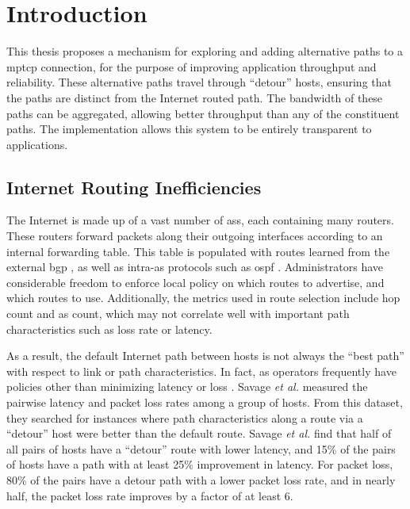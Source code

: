 \documentclass{cwru}
\begin{document}
\acresetall

\mainmatter
\chapter{Introduction}

This thesis proposes a mechanism for exploring and adding alternative paths to a
\ac{mptcp} connection, for the purpose of improving application throughput and
reliability. These alternative paths travel through ``detour'' hosts, ensuring
that the paths are distinct from the Internet routed path. The bandwidth of
these paths can be aggregated, allowing better throughput than any of the
constituent paths. The implementation allows this system to be entirely
transparent to applications.

\section{Internet Routing Inefficiencies}

The Internet is made up of a vast number of \acp{as}, each containing many
routers. These routers forward packets along their outgoing interfaces according
to an internal forwarding table. This table is populated with routes learned
from the external \ac{bgp} \cite{rfc4271}, as well as intra-\acs{as} protocols
such as \ac{ospf} \cite{rfc2328}. Administrators have considerable freedom to
enforce local policy on which routes to advertise, and which routes to use.
Additionally, the metrics used in route selection include hop count and \ac{as}
count, which may not correlate well with important path characteristics such as
loss rate or latency.

As a result, the default Internet path between hosts is not always the ``best
path'' with respect to link or path characteristics. In fact, \ac{as} operators
frequently have policies other than minimizing latency or loss \cite{detour}.
Savage \textit{et al.} \cite{detour} measured the pairwise latency and packet
loss rates among a group of hosts. From this dataset, they searched for
instances where path characteristics along a route via a ``detour'' host were
better than the default route. Savage \textit{et al.} \cite{detour} find that
half of all pairs of hosts have a ``detour'' route with lower latency, and 15\%
of the pairs of hosts have a path with at least 25\% improvement in latency. For
packet loss, 80\% of the pairs have a detour path with a lower packet loss rate,
and in nearly half, the packet loss rate improves by a factor of at least 6.
\end{document}
